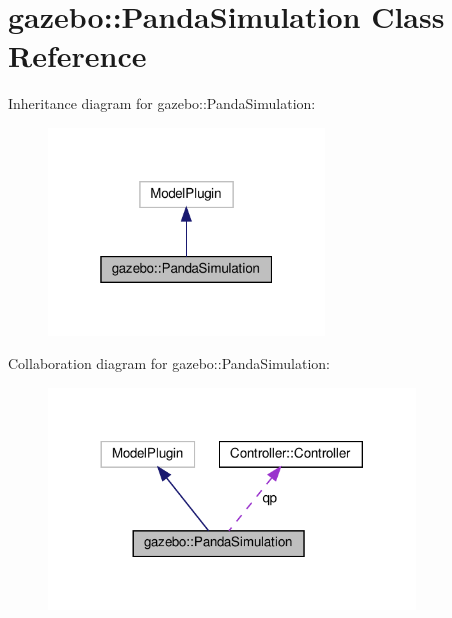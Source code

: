 \hypertarget{classgazebo_1_1_panda_simulation}{}\section{gazebo\+:\+:Panda\+Simulation Class Reference}
\label{classgazebo_1_1_panda_simulation}


Inheritance diagram for gazebo\+:\+:Panda\+Simulation\+:\nopagebreak
\begin{figure}[H]
\begin{center}
\leavevmode
\includegraphics[width=208pt]{classgazebo_1_1_panda_simulation__inherit__graph}
\end{center}
\end{figure}


Collaboration diagram for gazebo\+:\+:Panda\+Simulation\+:
\nopagebreak
\begin{figure}[H]
\begin{center}
\leavevmode
\includegraphics[width=276pt]{classgazebo_1_1_panda_simulation__coll__graph}
\end{center}
\end{figure}
